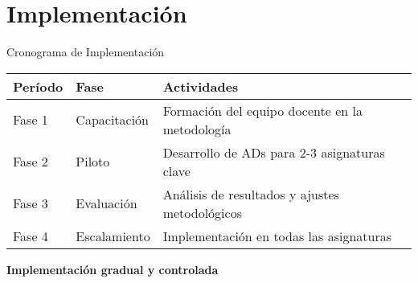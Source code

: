 \documentclass[10pt,aspectratio=169]{beamer}
\begin{document}
\section{Implementación}

\begin{frame}{Cronograma de Implementación}
	\begin{center}
		\begin{tabular}{@{}p{2cm}p{3cm}p{6cm}@{}}
			\toprule
			\textbf{Período} & \textbf{Fase} & \textbf{Actividades} \\
			\midrule
			Fase 1 & Capacitación & Formación del equipo docente en la metodología \\
			\midrule
			Fase 2 & Piloto & Desarrollo de ADs para 2-3 asignaturas clave \\
			\midrule
			Fase 3 & Evaluación & Análisis de resultados y ajustes metodológicos \\
			\midrule
			Fase 4 & Escalamiento & Implementación en todas las asignaturas \\
			\bottomrule
		\end{tabular}
	\end{center}
	
\vspace{0.5cm}
	
	\begin{center}
		\textcolor{verdeExito}{\textbf{Implementación gradual y controlada}}
	\end{center}
\end{frame}
		
\end{document}
